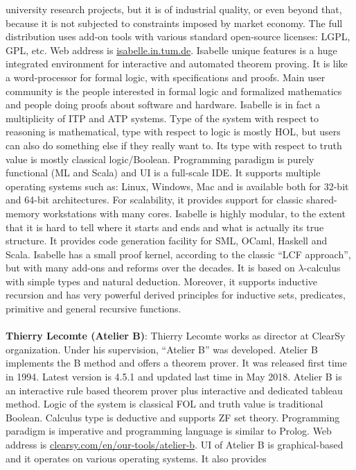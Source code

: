 university research projects, but it is of industrial quality, or even beyond that, because it is not subjected to constraints imposed by market 
economy. The full distribution uses add-on tools with various standard open-source licenses: LGPL, GPL, etc. 
Web address is \url{isabelle.in.tum.de}.
Isabelle unique features is a huge integrated environment for interactive and automated theorem proving. It is like a word-processor 
for formal logic, with specifications and proofs. Main user community is the people interested in formal 
logic and formalized mathematics and people doing proofs about software and hardware. Isabelle is in fact a multiplicity of ITP and ATP systems. 
Type of the system with respect to reasoning is mathematical, type with respect to logic is mostly HOL, but users can also do something else if 
they really want to. Its type with respect to
truth value is  mostly classical logic/Boolean. Programming paradigm is purely functional (ML and Scala) and UI is a full-scale IDE. 
It supports multiple operating systems such as: Linux, Windows, Mac and is available both for 32-bit and 
64-bit architectures. For scalability, it provides support for classic shared-memory workstations with many cores. 
Isabelle is highly modular, to the extent that it is hard to tell where it starts and ends and what is actually its true structure. 
It provides code generation facility for SML, OCaml, Haskell and Scala. Isabelle has a small proof kernel, according to the classic 
``LCF approach'', but with many add-ons and reforms over the decades. It is based on $\lambda$-calculus with simple types 
and natural deduction. Moreover, it supports inductive recursion and has very powerful derived principles for inductive sets, predicates, 
primitive and general recursive functions.
\\\\
{\bf Thierry Lecomte (Atelier B)}: Thierry Lecomte works as director at ClearSy organization. Under his supervision, ``Atelier B'' was developed. Atelier B 
implements the B method   and offers a theorem prover. It was released first time in 1994. Latest version is
4.5.1 and updated last time in May 2018.  
Atelier B is an interactive rule based theorem prover
plus interactive and dedicated tableau method. Logic of the system is classical FOL and truth value is 
traditional Boolean. Calculus type is deductive and supports ZF set theory. Programming paradigm is imperative and 
programming language is similar to Prolog. Web address is \url{clearsy.com/en/our-tools/atelier-b}.
UI of Atelier B is graphical-based and it operates on various operating systems. It also provides
